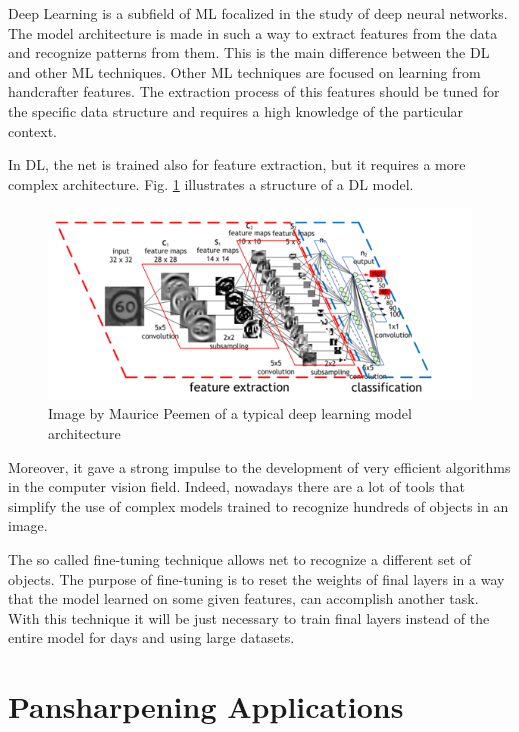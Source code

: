 \documentclass[12pt]{report}
\begin{document}
Deep Learning \cite{deeplearning} is a subfield of ML focalized in the study of deep neural networks.
The model architecture is made in such a way to extract features from the data and recognize patterns from them.
This is the main difference between the DL and other ML techniques.
Other ML techniques are focused on learning from handcrafter features.
The extraction process of this features should be tuned for the specific data structure and 
requires a high knowledge of the particular context.

In DL, the net is trained also for feature extraction, but it requires a more complex architecture.
Fig. \ref{fig:dl-architecture} illustrates a structure of a DL model. 

\begin{figure}[t]
    \centering
    \includegraphics[scale=1.2]{dlarchitecture.png}
    \caption{Image by Maurice Peemen of a typical deep learning model architecture}
    \label{fig:dl-architecture}
\end{figure}

Moreover, it gave a strong impulse to the development of very efficient algorithms in the computer vision field. 
Indeed, nowadays there are a lot of tools that simplify the use of complex models trained to 
recognize hundreds of objects in an image. 

The so called fine-tuning technique allows net to recognize a different set of objects.
The purpose of fine-tuning is to reset the weights of final layers in a way that the model learned on some given features, can accomplish another task.
With this technique it will be just necessary to train final layers instead of the entire model for days and using large datasets.


\section{Pansharpening Applications}
\end{document}

